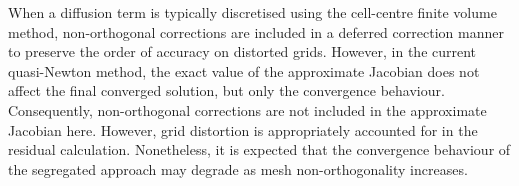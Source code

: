 \documentclass[sn-mathphys,Numbered]{sn-jnl}%
\begin{document}
When a diffusion term is typically discretised using the cell-centre finite volume method, non-orthogonal corrections are included in a deferred correction manner to preserve the order of accuracy on distorted grids.
However, in the current quasi-Newton method, the exact value of the approximate Jacobian does not affect the final converged solution, but only the convergence behaviour.
Consequently, non-orthogonal corrections are not included in the approximate Jacobian here. However, grid distortion is appropriately accounted for in the residual calculation.
Nonetheless, it is expected that the convergence behaviour of the segregated approach may degrade as mesh non-orthogonality increases.
\end{document}
